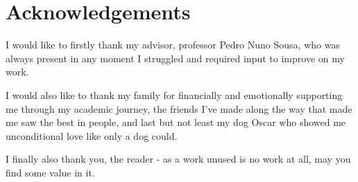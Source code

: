 \chapter{Acknowledgements}

    I would like to firstly thank my advisor, professor Pedro Nuno Sousa, who was always present in any moment I struggled and required input to improve on my work.

    I would also like to thank my family for financially and emotionally supporting me through my academic journey, the friends I've made along the way that made me saw the best in people, and last but not least my dog Oscar who showed me unconditional love like only a dog could.

    I finally also thank you, the reader - as a work unused is no work at all, may you find some value in it.
